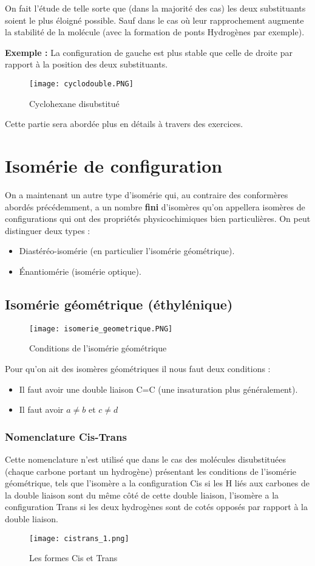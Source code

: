 \documentclass[a4paper, oneside]{book}
\begin{document}
On fait l'étude de telle sorte que (dans la majorité des cas) les deux substituants soient le plus éloigné possible. Sauf dans le cas où leur rapprochement augmente la stabilité de la molécule (avec la formation de ponts Hydrogènes par exemple).

\textbf{Exemple :} La configuration de gauche est plus stable que celle de droite par rapport à la position des deux substituants.
\begin{figure}[!h]
    \centering
    \texttt{[image: cyclodouble.PNG]}
    \caption{Cyclohexane disubstitué}
    \label{fig:my_label}
\end{figure}
Cette partie sera abordée plus en détails à travers des exercices.
\section{Isomérie de configuration}
On a maintenant un autre type d'isomérie qui, au contraire des conformères abordés précédemment, a un nombre \textbf{fini} d'isomères qu'on appellera isomères de configurations qui ont des propriétés physicochimiques bien particulières. On peut distinguer deux types :
\begin{itemize}
    \item Diastéréo-isomérie (en particulier l'isomérie géométrique).
    \item \'Enantiomérie (isomérie optique).
\end{itemize}
\subsection{Isomérie géométrique (éthylénique)}
\begin{figure}[!h]
    \centering
     \texttt{[image: isomerie\_geometrique.PNG]}
    \caption{Conditions de l'isomérie géométrique}
    \label{fig:my_label}
\end{figure}
Pour qu'on ait des isomères géométriques il nous faut deux conditions :
\begin{itemize}
    \item Il faut avoir une double liaison C=C (une insaturation plus généralement).
    \item Il faut avoir $a \ne b$ et $c \ne d$
\end{itemize}
\subsubsection{Nomenclature Cis-Trans}
Cette nomenclature n'est utilisé que dans le cas des molécules disubstituées (chaque carbone portant un hydrogène) présentant les conditions de l'isomérie géométrique, tels que l'isomère a la configuration Cis si les H liés aux carbones de la double liaison sont du même côté de cette double liaison, l'isomère a la configuration Trans si les deux hydrogènes sont de cotés opposés par rapport à la double liaison.
\begin{figure}[!h]
    \centering
    \texttt{[image: cistrans\_1.png]}
    \caption{Les formes Cis et Trans}
    \label{fig:my_label}
\end{figure}
\end{document}

